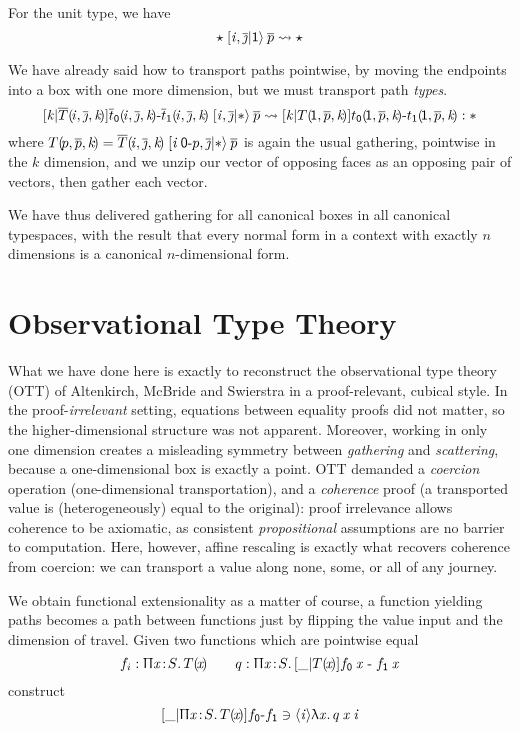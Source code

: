 \documentclass{article}
\begin{document}
For the unit type, we have
\[
\xp{\vi,\jj}{\UN}{\vd}\:\myv p \leadsto \vd
\]

We have already said how to transport paths pointwise, by moving the endpoints into a
box with one more dimension, but we must transport path \emph{types}.
\[
\xp{\vi,\jj}{\TY}{\INR\vk{\myv T\sv{\vi,\jj,\vk}}
                  {\ra{\sze {\myv t}\sv{\vi,\jj,\vk}}{\sun {\myv t}\sv{\vi,\jj,\vk}}}}
  \:\myv p \leadsto
\INR\vk{T\sv{\pun,\myv p,\vk}}{\ra{\sze t\sv{\pun,\myv p,\vk}}{\sun t\sv{\pun,\myv p,\vk}}}
: \TY
\]
where $T\sv{p,\myv p,k} = \xp{\vi\:\ra\pze p,\jj}{\TY}{\myv T\sv{\vi,\jj,\vk}}\:\myv p$
is again the usual gathering, pointwise in the $k$ dimension, and we unzip our
vector of opposing faces as an opposing pair of vectors, then gather each vector.

We have thus delivered gathering for all canonical boxes in all canonical typespaces,
with the result that every normal form in a context with exactly $n$ dimensions is a
canonical $n$-dimensional form.


\section{Observational Type Theory}

What we have done here is exactly to reconstruct the observational type theory (OTT) of Altenkirch, McBride and Swierstra in a proof-relevant, cubical style. In the proof-\emph{irrelevant} setting, equations between equality proofs did not matter,
so the higher-dimensional structure was not apparent. Moreover, working in only one
dimension creates a misleading symmetry between \emph{gathering} and \emph{scattering},
because a one-dimensional box is exactly a point. OTT demanded a
\emph{coercion} operation (one-dimensional transportation), and a \emph{coherence} proof
(a transported value is (heterogeneously) equal to the original): proof irrelevance
allows coherence to be axiomatic, as consistent \emph{propositional} assumptions are
no barrier to computation. Here, however, affine rescaling is exactly what recovers
coherence from coercion: we can transport a value along none, some, or all of any journey.

We obtain functional extensionality as a matter of course, a function yielding paths becomes a path between functions just by flipping the value input and the dimension of travel. Given
two functions which are pointwise equal
\[
f_i:\PI\vx S T\sv\vx \qquad
q:\PI\vx S \INR\_{T\sv\vx}{\ra{\sze f\:\vx\;}{\;\sun f\:\vx}}
\]
construct
\[
\INR\_{\PI\vx S T\sv\vx}{\rai f} \ni
\inr\vi{\la\vx q\:\vx\:\vi}
\]
\end{document}
